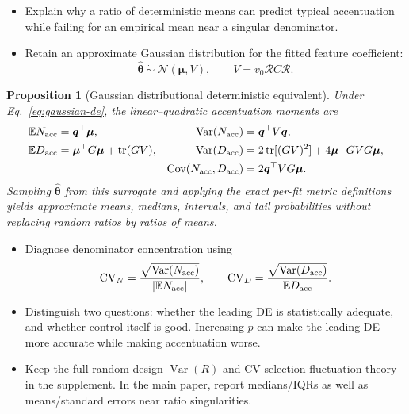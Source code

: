 \documentclass[11pt]{article}
\newtheorem{proposition}[theorem]{Proposition}
\newcommand{\E}{\mathbb{E}}
\newcommand{\tr}{\operatorname{tr}}
\newcommand{\Var}{\operatorname{Var}}
\newcommand{\Cov}{\operatorname{Cov}}
\newcommand{\that}{\widehat{\bm\theta}}
\newcommand{\Rcal}{\mathcal R}
\begin{document}
\begin{itemize}
  \item Explain why a ratio of deterministic means can predict typical
        accentuation while failing for an empirical mean near a singular
        denominator.
  \item Retain an approximate Gaussian distribution for the fitted feature
        coefficient:
  \begin{equation}
    \that\ \dot\sim\ \mathcal N(\bm\mu,V),
    \qquad V=v_0\Rcal C\Rcal.
    \label{eq:gaussian-de}
  \end{equation}
\end{itemize}

\begin{proposition}[Gaussian distributional deterministic equivalent]
\label{prop:gaussian-de}
Under Eq.~\eqref{eq:gaussian-de}, the linear--quadratic accentuation moments
are
\begin{align}
  \E N_{\rm acc}&=\bm q^{\top}\bm\mu,
  &\Var(N_{\rm acc})&=\bm q^{\top}V\bm q,\\
  \E D_{\rm acc}&=\bm\mu^{\top}G\bm\mu+\tr(GV),
  &\Var(D_{\rm acc})
    &=2\tr[(GV)^2]+4\bm\mu^{\top}GVG\bm\mu,\\
  &&\Cov(N_{\rm acc},D_{\rm acc})
    &=2\bm q^{\top}VG\bm\mu.
\end{align}
Sampling $\that$ from this surrogate and applying the exact per-fit metric
definitions yields approximate means, medians, intervals, and tail
probabilities without replacing random ratios by ratios of means.
\end{proposition}

\begin{itemize}
  \item Diagnose denominator concentration using
  \begin{equation}
    \mathrm{CV}_{N}
      =\frac{\sqrt{\Var(N_{\rm acc})}}{|\E N_{\rm acc}|},
    \qquad
    \mathrm{CV}_{D}
      =\frac{\sqrt{\Var(D_{\rm acc})}}{\E D_{\rm acc}}.
  \end{equation}
  \item Distinguish two questions: whether the leading DE is statistically
        adequate, and whether control itself is good. Increasing $p$ can make
        the leading DE more accurate while making accentuation worse.
  \item Keep the full random-design $\Var(R)$ and CV-selection fluctuation
        theory in the supplement. In the main paper, report medians/IQRs as
        well as means/standard errors near ratio singularities.
\end{itemize}
\end{document}
